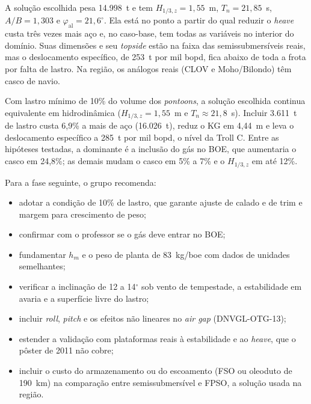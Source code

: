 \documentclass[11pt,a4paper]{article}
\newcommand{\phial}{\varphi_{\mathrm{al}}}
\newcommand{\Hz}{H_{1/3,z}}
\begin{document}
A solução escolhida pesa 14.998~t e tem $\Hz = 1{,}55$~m, $T_n = 21{,}85$~s, $A/B = 1{,}303$ e
$\phial = 21{,}6^\circ$. Ela está no ponto a partir do qual reduzir o \emph{heave} custa três vezes
mais aço e, no caso-base, tem todas as variáveis no interior do domínio. Suas dimensões e seu
\emph{topside} estão na faixa das semissubmersíveis reais, mas o deslocamento específico, de 253~t
por mil bopd, fica abaixo de toda a frota por falta de lastro. Na região, os análogos reais (CLOV e
Moho/Bilondo) têm casco de navio.

Com lastro mínimo de 10\% do volume dos \emph{pontoons}, a solução escolhida continua equivalente em
hidrodinâmica ($\Hz = 1{,}55$~m e $T_n \approx 21{,}8$~s). Incluir 3.611~t de lastro custa 6,9\% a
mais de aço (16.026~t), reduz o KG em 4,44~m e leva o deslocamento específico a 285~t por mil bopd,
o nível da Troll C. Entre as hipóteses testadas, a dominante é a inclusão do gás no BOE, que
aumentaria o casco em 24,8\%; as demais mudam o casco em 5\% a 7\% e o $\Hz$ em até 12\%.

Para a fase seguinte, o grupo recomenda:
\begin{itemize}
\item adotar a condição de 10\% de lastro, que garante ajuste de calado e de trim e margem para
crescimento de peso;
\item confirmar com o professor se o gás deve entrar no BOE;
\item fundamentar $h_m$ e o peso de planta de 83~kg/boe com dados de unidades semelhantes;
\item verificar a inclinação de 12 a 14$^\circ$ sob vento de tempestade, a estabilidade em avaria e
a superfície livre do lastro;
\item incluir \emph{roll}, \emph{pitch} e os efeitos não lineares no \emph{air gap} (DNVGL-OTG-13);
\item estender a validação com plataformas reais à estabilidade e ao \emph{heave}, que o pôster de
2011 não cobre;
\item incluir o custo do armazenamento ou do escoamento (FSO ou oleoduto de 190~km) na comparação
entre semissubmersível e FPSO, a solução usada na região.
\end{itemize}
\end{document}
